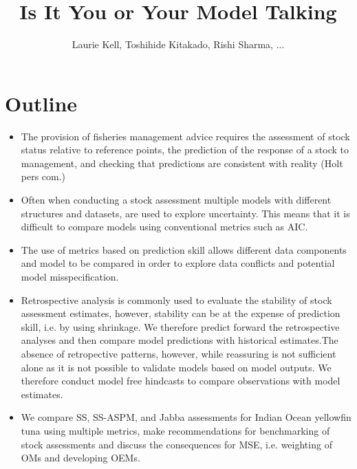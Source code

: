 \documentclass[a4paper]{article}
\title{Is It You or Your Model Talking}
\author{Laurie Kell, Toshihide Kitakado, Rishi Sharma, ...}
\begin{document}
\maketitle
 
\section*{Outline}

\begin{itemize}
    \item The provision of fisheries management advice requires the assessment of stock status relative to reference points, the prediction of the response of a stock to management, and checking that predictions are consistent with reality (Holt pers com.)    
    \item Often when conducting a stock assessment multiple models with different structures and datasets, are used to explore uncertainty. This means that it is difficult to compare models using conventional metrics such as AIC. 
    \item The use of metrics based on prediction skill allows different data components and model to be compared in order to explore data conflicts and potential model misspecification. %
    \item Retrospective analysis is commonly used to evaluate the stability of stock assessment estimates, however, stability can be at the expense of prediction skill, i.e. by using shrinkage. We therefore predict forward the retrospective analyses and then compare model predictions with historical estimates.The absence of retropective patterns, however, while reassuring is not sufficient alone as it is not possible to validate models based on model outputs. We therefore conduct model free hindcasts to compare observations with model estimates. 
    \item  We  compare SS, SS-ASPM, and Jabba assessments for Indian Ocean yellowfin tuna  using multiple metrics, make recommendations for benchmarking of stock assessments and discuss the consequences for MSE, i.e. weighting of OMs and developing OEMs.    
\end{itemize}

\newpage     
\tableofcontents 
\end{document}
